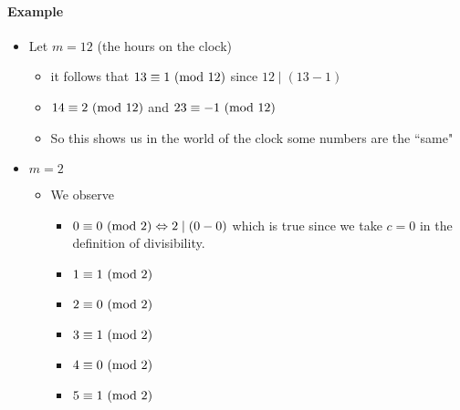 \documentclass[11pt]{book}
\begin{document}
\paragraph{Example} 
\begin{itemize}
    \item Let $m = 12$ (the hours on the clock)
        \begin{itemize}
            \item it follows that $13 \equiv 1 \ (\mathrm{mod}\ 12) $ since $12 \mid \left( 13  - 1 \right) $ 
            \item $14 \equiv 2 \ (\mathrm{mod}\ 12) $ and $23 \equiv -1 \ (\mathrm{mod}\ 12) $ 
            \item So this shows us in the world of the clock some numbers are the ``same"
        \end{itemize}
    \item $m = 2$ 
        \begin{itemize}
            \item We observe 
                \begin{itemize}
                    \item $0 \equiv 0 \ (\mathrm{mod}\ 2) \Leftrightarrow 2 \mid \left( 0  - 0 \right) $ which is true since we take $c = 0$ in the definition of divisibility.
                    \item $1 \equiv 1 \ (\mathrm{mod}\ 2) $ 
                    \item $2 \equiv 0 \ (\mathrm{mod}\ 2) $ 
                    \item $3 \equiv 1 \ (\mathrm{mod}\ 2) $ 
                    \item $4 \equiv 0 \ (\mathrm{mod}\ 2) $ 
                    \item $5 \equiv 1 \ (\mathrm{mod}\ 2) $ 
                \end{itemize}
        \end{itemize}
\end{itemize}


\end{document}
